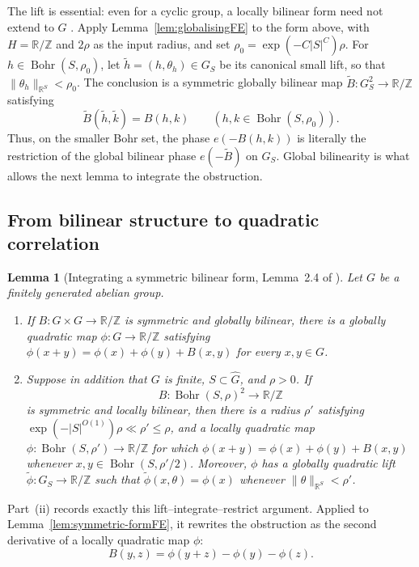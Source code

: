\documentclass[12pt]{article}
\newtheorem{lemma}[theorem]{Lemma}
\begin{document}
The lift is essential: even for a cyclic group, a locally bilinear form need
not extend to $G$ \cite[Example~2.3]{JamneshanTaoFE}.
Apply Lemma~\ref{lem:globalisingFE} to the form above, with
$H=\mathbb{R}/\mathbb{Z}$ and $2\rho$ as the input radius, and set
$\rho_0=\exp(-C|S|^C)\rho$.  For
$h\in\operatorname{Bohr}(S,\rho_0)$, let
$\widetilde h=(h,\theta_h)\in G_S$ be its canonical small lift, so that
$\|\theta_h\|_{\mathbb{R}^S}<\rho_0$.  The conclusion is a symmetric globally
bilinear map $\widetilde B:G_S^2\to\mathbb{R}/\mathbb{Z}$ satisfying
\[
 \widetilde B(\widetilde h,\widetilde k)=B(h,k)
 \qquad
 (h,k\in\operatorname{Bohr}(S,\rho_0)).
\]
Thus, on the smaller Bohr set, the phase $e(-B(h,k))$ is literally the
restriction of the global bilinear phase $e(-\widetilde B)$ on $G_S$.
Global bilinearity is what allows the next lemma to integrate the obstruction.

\subsection{From bilinear structure to quadratic correlation}
\label{sec:theorem-1-6FE}

\begin{lemma}[Integrating a symmetric bilinear form, Lemma~2.4 of
\cite{JamneshanTaoFE}]
\label{lem:integratingFE}
Let $G$ be a finitely generated abelian group.
\begin{enumerate}
 \item[(i)] If $B:G\times G\to\mathbb{R}/\mathbb{Z}$ is symmetric and
 globally bilinear, there is a globally quadratic map
 $\phi:G\to\mathbb{R}/\mathbb{Z}$ satisfying
 $\phi(x+y)=\phi(x)+\phi(y)+B(x,y)$ for every $x,y\in G$.
 \item[(ii)] Suppose in addition that $G$ is finite, $S\subset\widehat G$,
 and $\rho>0$.  If
 \[
  B:\operatorname{Bohr}(S,\rho)^2\longrightarrow\mathbb{R}/\mathbb{Z}
 \]
 is symmetric and locally bilinear, then there is a radius $\rho'$ satisfying
 $\exp(-|S|^{O(1)})\rho\ll\rho'\leq\rho$,
 and a locally quadratic map
 $\phi:\operatorname{Bohr}(S,\rho')\to\mathbb{R}/\mathbb{Z}$ for which
 $\phi(x+y)=\phi(x)+\phi(y)+B(x,y)$ whenever
 $x,y\in\operatorname{Bohr}(S,\rho'/2)$.  Moreover, $\phi$ has a
 globally quadratic lift $\widetilde\phi:G_S\to\mathbb{R}/\mathbb{Z}$ such
 that $\widetilde\phi(x,\theta)=\phi(x)$ whenever
 $\|\theta\|_{\mathbb{R}^S}<\rho'$.
\end{enumerate}
\end{lemma}

Part~(ii) records exactly this lift--integrate--restrict argument.  Applied to
Lemma~\ref{lem:symmetric-formFE}, it rewrites the obstruction as the second
derivative of a locally quadratic map $\phi$:
\[
 B(y,z)=\phi(y+z)-\phi(y)-\phi(z).
\]
\end{document}
